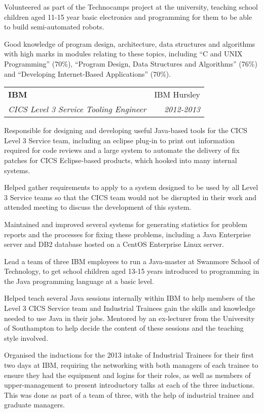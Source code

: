 \documentclass[letterpaper,11pt]{article}
\makeatletter
\newlength{\outerbordwidth}
\newcommand{\resheading}[1]{\vspace{8pt}
  \parbox{\textwidth}{\setlength{\FrameSep}{\outerbordwidth}
    \begin{shaded}
\setlength{\fboxsep}{0pt}\framebox[\textwidth][l]{\setlength{\fboxsep}{4pt}\fcolorbox{shadecolorB}{shadecolorB}{\textbf{\sffamily{\mbox{~}\makebox[6.762in][l]{\large #1} \vphantom{p\^{E}}}}}}
    \end{shaded}
  }\vspace{-5pt}
}
\newcommand{\ressubheading}[4]{
\begin{tabular*}{6.5in}{l@{\cftdotfill{\cftsecdotsep}\extracolsep{\fill}}r}
		\textbf{#1} & #2 \\
		\textit{#3} & \textit{#4} \\
\end{tabular*}\vspace{-6pt}}
\makeatother
\begin{document}
Volunteered as part of the Technocamps project at the university, teaching school children aged 11-15 year basic electronics and programming for them to be able to build semi-automated robots.

Good knowledge of program design, architecture, data structures and algorithms with high marks in modules relating to these topics, including ``C and UNIX Programming'' (70\%), ``Program Design, Data Structures and Algorithms'' (76\%) and ``Developing Internet-Based Applications'' (70\%).




\resheading{Work Experience}
\ressubheading{IBM}{IBM Hursley}{CICS Level 3 Service Tooling Engineer}{2012-2013}
\vspace{10pt}

Responsible for designing and developing useful Java-based tools for the CICS Level 3 Service team, including an eclipse plug-in to print out information required for code reviews and a large system to automate the delivery of fix patches for CICS Eclipse-based products, which hooked into many internal systems.

Helped gather requirements to apply to a system designed to be used by all Level 3 Service teams so that the CICS team would not be disrupted in their work and attended meeting to discuss the development of this system.

Maintained and improved several systems for generating statistics for problem reports and the processes for fixing these problems, including a Java Enterprise server and DB2 database hosted on a CentOS Enterprise Linux server.

Lead a team of three IBM employees to run a Java-master at Swanmore School of Technology, to get school children aged 13-15 years introduced to programming in the Java programming language at a basic level.

Helped teach several Java sessions internally within IBM to help members of the Level 3 CICS Service team and Industrial Trainees gain the skills and knowledge needed to use Java in their jobs. Mentored by an ex-lecturer from the University of Southampton to help decide the content of these sessions and the teaching style involved.

Organised the inductions for the 2013 intake of Industrial Trainees for their first two days at IBM, requiring the networking with both managers of each trainee to ensure they had the equipment and logins for their roles, as well as members of upper-management to present introductory talks at each of the three inductions. This was done as part of a team of three, with the help of industrial trainee and graduate managers.
\end{document}
